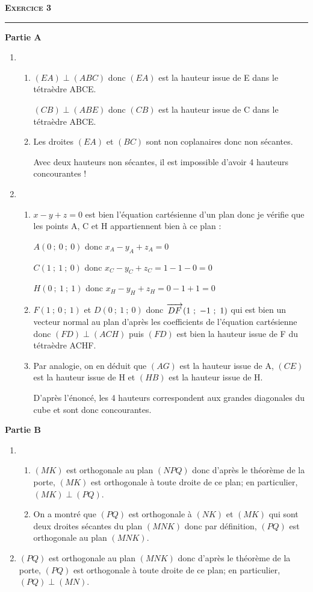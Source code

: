 \documentclass[10pt]{article}
\newcommand{\vect}[1]{\overrightarrow{\,\mathstrut#1\,}}
\begin{document}
\textbf{\textsc{Exercice 3}} \smallskip  \hrule \medskip 

\textbf{Partie A}
\begin{enumerate}
	\item 
	\begin{enumerate}
		\item $(EA) \perp (ABC)$ donc $(EA)$ est la hauteur issue de E dans le tétraèdre ABCE.\smallskip 
		
		$(CB) \perp (ABE)$ donc $(CB)$ est la hauteur issue de C dans le tétraèdre ABCE.
		
		\item Les droites $(EA)$ et $(BC)$ sont non coplanaires donc non sécantes.\smallskip 
		
		Avec deux hauteurs non sécantes, il est impossible d'avoir 4 hauteurs concourantes !
	\end{enumerate}
	\item 
	\begin{enumerate}
		\item $x-y+z=0$ est bien l'équation cartésienne d'un plan donc je vérifie que les points A, C et H appartiennent bien à ce plan :
		

$A(0~;~0~;~0)$ donc $x_A-y_A+z_A=0$

$C(1~;~1~;~0)$ donc $x_C-y_C+z_C=1-1-0=0$

$H(0~;~1~;~1)$ donc $x_H-y_H+z_H=0-1+1=0$
		\item $F(1~;~0~;~1)$ et $D(0~;~1~;~0)$ donc $\vect{DF}(1~;~-1~;~1)$ qui est bien un vecteur normal au plan d'après les coefficients de l'équation cartésienne donc $(FD) \perp (ACH)$ puis $(FD)$ est bien la hauteur issue de F du tétraèdre ACHF.
		\item Par analogie, on en déduit que $(AG)$ est la hauteur issue de A, $(CE)$ est la hauteur issue de H et $(HB)$ est la hauteur issue de H.
		
D'après l'énoncé, les 4 hauteurs correspondent aux \og grandes diagonales \fg{} du cube et sont donc concourantes.
	\end{enumerate}
\end{enumerate}

\medskip 

\textbf{Partie B}
\begin{enumerate}
	\item 
	\begin{enumerate}
		\item $(MK)$ est orthogonale au plan $(NPQ)$ donc d'après le théorème de la porte, $(MK)$ est orthogonale à toute droite de ce plan;  en particulier, $(MK) \perp (PQ)$.
		\item On a montré que $(PQ)$ est orthogonale à $(NK)$ et $(MK)$ qui sont deux droites sécantes du plan $(MNK)$ donc par définition, $(PQ)$ est orthogonale au plan $(MNK)$.
	\end{enumerate}
	\item $(PQ)$ est orthogonale au plan $(MNK)$ donc d'après le théorème de la porte, $(PQ)$ est orthogonale à toute droite de ce plan;  en particulier, $(PQ) \perp (MN)$.
\end{enumerate}\medskip 
\end{document}
